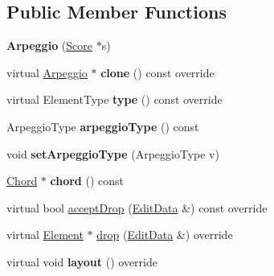 \subsection*{Public Member Functions}
\begin{DoxyCompactItemize}
\item 
\mbox{\label{class_ms_1_1_arpeggio_af2ee52123d2c0edf807d2b9e00638d5e}} 
{\bfseries Arpeggio} (\hyperlink{class_ms_1_1_score}{Score} $\ast$s)
\item 
\mbox{\label{class_ms_1_1_arpeggio_acba01242145ba7edb0f40daf0c8da86f}} 
virtual \hyperlink{class_ms_1_1_arpeggio}{Arpeggio} $\ast$ {\bfseries clone} () const override
\item 
\mbox{\label{class_ms_1_1_arpeggio_aba4f386a6b5693ea1a1878856e91185b}} 
virtual Element\+Type {\bfseries type} () const override
\item 
\mbox{\label{class_ms_1_1_arpeggio_a8ea9a9c8f48bfda30ed85c6e947d61d3}} 
Arpeggio\+Type {\bfseries arpeggio\+Type} () const
\item 
\mbox{\label{class_ms_1_1_arpeggio_a67086513e9765ed00aae443d001ba6da}} 
void {\bfseries set\+Arpeggio\+Type} (Arpeggio\+Type v)
\item 
\mbox{\label{class_ms_1_1_arpeggio_ac531236e34a248ead6c1178f95eb7ae6}} 
\hyperlink{class_ms_1_1_chord}{Chord} $\ast$ {\bfseries chord} () const
\item 
virtual bool \hyperlink{class_ms_1_1_arpeggio_a5d4feb5b9eb35c1afb9e14a7e0fad66b}{accept\+Drop} (\hyperlink{class_ms_1_1_edit_data}{Edit\+Data} \&) const override
\item 
virtual \hyperlink{class_ms_1_1_element}{Element} $\ast$ \hyperlink{class_ms_1_1_arpeggio_a2e88f8c714c6b69b52503d48729b973b}{drop} (\hyperlink{class_ms_1_1_edit_data}{Edit\+Data} \&) override
\item 
\mbox{\label{class_ms_1_1_arpeggio_ab53225de392b4269ee0329a6ad0e046d}} 
virtual void {\bfseries layout} () override
\item 
\mbox{\label{class_ms_1_1_arpeggio_a712d06aa7723f35b2c645a55019c7d0a}} 

\end{DoxyCompactItemize}
